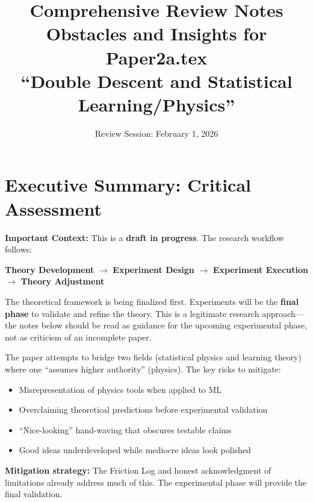 \documentclass[11pt]{article}
\title{\textbf{Comprehensive Review Notes}\\
\Large Obstacles and Insights for Paper2a.tex\\
\small ``Double Descent and Statistical Learning/Physics''}
\author{Review Session: February 1, 2026}
\date{}
\begin{document}
\maketitle

\tableofcontents
\newpage

\section{Executive Summary: Critical Assessment}

\begin{tcolorbox}[colback=blue!5, colframe=blue!60, title=Draft Status Note]
\textbf{Important Context:} This is a \textbf{draft in progress}. The research workflow follows:
\begin{center}
\textbf{Theory Development} $\to$ \textbf{Experiment Design} $\to$ \textbf{Experiment Execution} $\to$ \textbf{Theory Adjustment}
\end{center}
The theoretical framework is being finalized first. Experiments will be the \textbf{final phase} to validate and refine the theory. This is a legitimate research approach---the notes below should be read as guidance for the upcoming experimental phase, not as criticism of an incomplete paper.
\end{tcolorbox}

\begin{vuongmacbox}
The paper attempts to bridge two fields (statistical physics and learning theory) where one ``assumes higher authority'' (physics). The key risks to mitigate:
\begin{itemize}
    \item Misrepresentation of physics tools when applied to ML
    \item Overclaiming theoretical predictions before experimental validation
    \item ``Nice-looking'' hand-waving that obscures testable claims
    \item Good ideas underdeveloped while mediocre ideas look polished
\end{itemize}
\textbf{Mitigation strategy:} The Friction Log and honest acknowledgment of limitations already address much of this. The experimental phase will provide the final validation.
\end{vuongmacbox}
\end{document}
